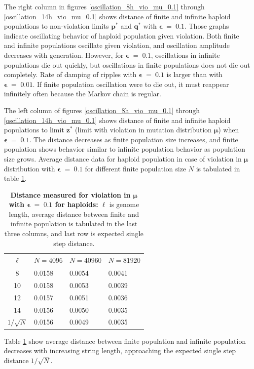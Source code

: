 \clearpage

The right column in figures \ref{oscillation_8h_vio_mu_0.1} through \ref{oscillation_14h_vio_mu_0.1} 
shows distance of finite and infinite haploid populations to non-violation limits $\bm{p^\ast}$ and $\bm{q^\ast}$ with $\bm{\epsilon} \;=\; 0.1$. 
Those graphs indicate oscillating behavior of haploid population given violation. 
Both finite and infinite populations oscillate given violation, and oscillation amplitude decreases with generation. 
However, for $\bm{\epsilon} \;=\; 0.1$, oscillations in infinite populations die out quickly, 
but oscillations in finite populations does not die out completely. Rate of damping of ripples with $\bm{\epsilon} \;=\; 0.1$ is  
larger than with $\bm{\epsilon} \;=\; 0.01$. If finite population oscillation were to die out, 
it must reappear infinitely often because the Markov chain is regular.

The left column of figures \ref{oscillation_8h_vio_mu_0.1} through \ref{oscillation_14h_vio_mu_0.1} 
shows distance of finite and infinite haploid populations to limit $\bm{z^\ast}$ 
(limit with violation in mutation distribution $\bm{\mu}$) when $\bm{\epsilon} \;=\; 0.1$. 
The distance decreases as finite population size increases, 
and finite population shows behavior similar to infinite population behavior as population size grows. 
Average distance data for haploid population in case of violation in $\bm{\mu}$ distribution 
with $\bm{\epsilon} \;=\; 0.1$ for different finite population size $N$ is tabulated in table \ref{distanceMuHapEps0.1}.

\begin{table}[ht]
\caption[\textbf{Distance measured for violation in $\bm{\mu}$ with $\bm{\epsilon} \;=\; 0.1$ for haploids}]{\textbf{Distance measured for violation in $\bm{\mu}$ with $\bm{\epsilon} \;=\; 0.1$ for haploids:} $\ell$ is genome length, 
average distance between finite and infinite population is tabulated in the last three columns, and last row is expected single step distance.}
\centering
\begin{tabularx}{0.75\textwidth}{ c *{3}{X}}
\toprule
$\ell$ & $N = 4096$ & $N = 40960$ & $N = 81920$ \\
\midrule
8 & 0.0158	& 0.0054 	& 0.0041 \\
10 & 0.0158	& 0.0053 	& 0.0039 \\	
12 & 0.0157	& 0.0051 	& 0.0036 \\	
14 & 0.0156	& 0.0050 	& 0.0035 \\
\midrule
$1/\sqrt{N}$ & 0.0156 & 0.0049 & 0.0035 \\
\bottomrule
\end{tabularx}
\label{distanceMuHapEps0.1}
\end{table}

Table \ref{distanceMuHapEps0.1} show average distance 
between finite population and infinite population decreases with increasing string length, 
approaching the expected single step distance $1/\sqrt{N}$. 
